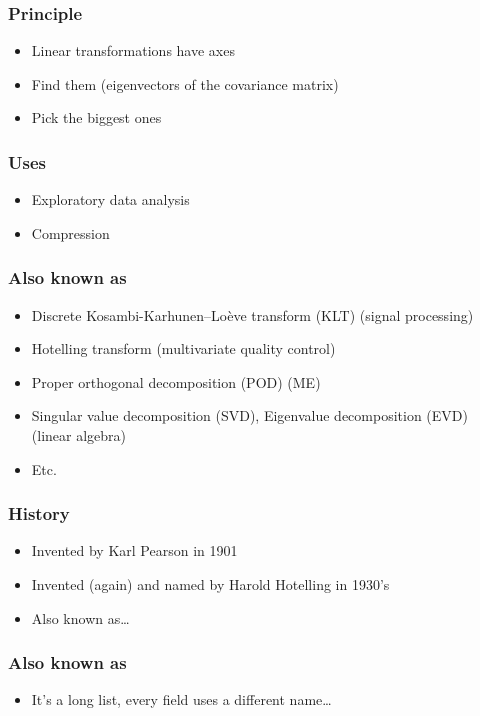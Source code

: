 \begin{frame}[t]
  \frametitle{Principle}

  \vspace{1cm}
  \begin{itemize}
  \item Linear transformations have axes
  \item Find them (eigenvectors of the covariance matrix)
  \item Pick the biggest ones
  \end{itemize}

  \vspace{5mm}
\end{frame}

\begin{frame}
  \frametitle{Uses}
  \begin{itemize}
  \item Exploratory data analysis
  \item Compression
  \end{itemize}
\end{frame}

\begin{frame}
  \frametitle{Also known as}
  \begin{itemize}
  \item Discrete Kosambi-Karhunen–Loève transform (KLT) (signal processing)
  \item Hotelling transform (multivariate quality control)
  \item Proper orthogonal decomposition (POD) (ME)
  \item Singular value decomposition (SVD), Eigenvalue decomposition (EVD) (linear algebra)
  \item Etc.
  \end{itemize}
\end{frame}

\begin{frame}
  \frametitle{History}
  \begin{itemize}
  \item Invented by Karl Pearson in 1901
  \item Invented (again) and named by Harold Hotelling in 1930's
  \item Also known as\dots
  \end{itemize}
\end{frame}

\begin{frame}
  \frametitle{Also known as}

  \begin{itemize}
  \item It's a long list, every field uses a different name\dots
  \end{itemize}
\end{frame}



